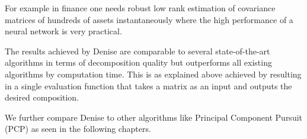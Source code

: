 For example in finance one needs robust low rank estimation of covariance matrices of hundreds of assets instantaneously where the high performance of a neural network is very practical.

The results achieved by Denise are comparable to several state-of-the-art algorithms in terms of decomposition quality but outperforms all existing algorithms by computation time. This is as explained above achieved by resulting in a single evaluation function that takes a matrix as an input and outputs the desired composition.

We further compare Denise to other algorithms like Principal Component Pursuit (PCP) as seen in the following chapters.




